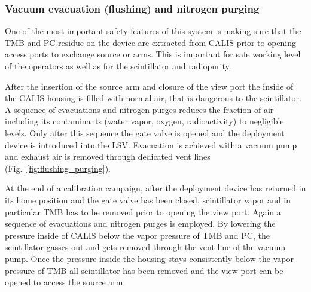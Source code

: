\subsubsection*{Vacuum evacuation (flushing) and nitrogen purging}
One of the most important safety features of this system is making sure that the TMB and PC residue on the device are extracted from CALIS prior to opening access ports to exchange source or arms. This is  important for safe working level of the operators as well as for the scintillator and radiopurity. 

After the insertion of the source arm and closure of the view port the inside of the CALIS housing is filled with normal air, that is dangerous to the scintillator. A sequence of evacuations and nitrogen purges reduces the fraction of air including its contaminants (water vapor, oxygen, radioactivity) to negligible levels. Only after this sequence the gate valve is opened and the deployment device is introduced into the LSV. Evacuation is achieved with a vacuum pump and exhaust air is removed through dedicated vent lines (Fig.~\ref{fig:flushing_purging}).

At the end of a calibration campaign, after the deployment device has returned in its home position and the gate valve has been closed, scintillator vapor and in particular TMB has to be removed prior to opening the view port. Again a sequence of evacuations and nitrogen purges is employed. By lowering the pressure inside of CALIS below the vapor pressure of TMB and PC, the scintillator gasses out and gets removed through the vent line of the vacuum pump. Once the pressure inside the housing stays consistently below the vapor pressure of TMB all scintillator has been removed and the view port can be opened to access the source arm.
 
